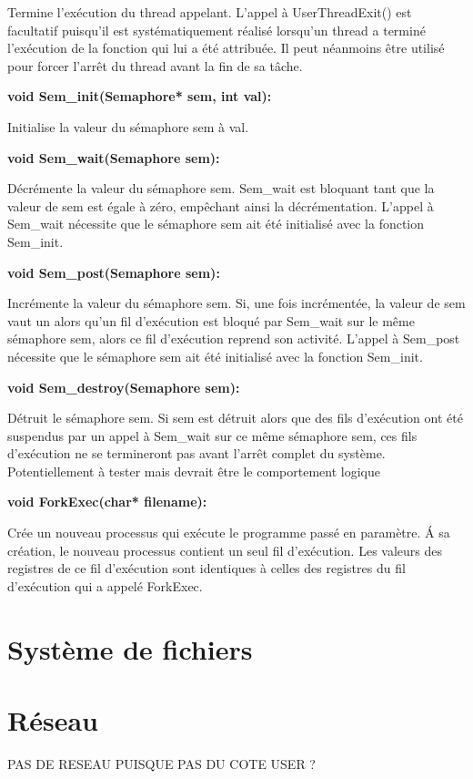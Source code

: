 \documentclass[12pt]{report}
\begin{document}
Termine l'exécution du thread appelant. L'appel à UserThreadExit() est facultatif puisqu'il est systématiquement réalisé lorsqu'un thread a terminé l'exécution de la fonction qui lui a été attribuée. Il peut néanmoins être utilisé pour forcer l'arrêt du thread avant la fin de sa tâche.
\bigskip


\textbf{void Sem\_init(Semaphore* sem, int val):}

Initialise la valeur du sémaphore sem à val.
\bigskip	


\textbf{void Sem\_wait(Semaphore sem):}

Décrémente la valeur du sémaphore sem. Sem\_wait est bloquant tant que la valeur de sem est égale à zéro, empêchant ainsi la décrémentation.
L'appel à Sem\_wait nécessite que le sémaphore sem ait été initialisé avec la fonction Sem\_init.
\bigskip


\textbf{void Sem\_post(Semaphore sem):}

Incrémente la valeur du sémaphore sem. Si, une fois incrémentée, la valeur de sem vaut un alors qu'un fil d'exécution est bloqué par Sem\_wait sur le même sémaphore sem, alors ce fil d'exécution reprend son activité.
L'appel à Sem\_post nécessite que le sémaphore sem ait été initialisé avec la fonction Sem\_init.
\bigskip


\textbf{void Sem\_destroy(Semaphore sem):}

Détruit le sémaphore sem. Si sem est détruit alors que des fils d'exécution ont été suspendus par un appel à Sem\_wait sur ce même sémaphore sem, ces fils d'exécution ne se termineront pas avant l'arrêt complet du système.\\
\color{red}Potentiellement à tester mais devrait être le comportement logique\color{black}
\bigskip


\textbf{void ForkExec(char* filename):}

Crée un nouveau processus qui exécute le programme passé en paramètre. \'A sa création, le nouveau processus contient un seul fil d'exécution. Les valeurs des registres de ce fil d'exécution sont identiques à celles des registres du fil d'exécution qui a appelé ForkExec.
\bigskip


\section{Système de fichiers}


\section{Réseau}
\color{red}PAS DE RESEAU PUISQUE PAS DU COTE USER ?\color{black}
\end{document}
